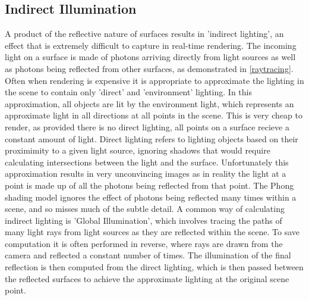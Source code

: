 \documentclass[ %
                    author={Gavin Parker},
                supervisor={Dr. Neill Campbell},
                    degree={MEng},
                     title={Deep Siamese Networks for Illumination Estimation from Stereo Images},
                  subtitle={},
                      type={research},
                      year={2018} ]{dissertation}
\begin{document}
\subsection{Indirect Illumination}
A product of the reflective nature of surfaces results in 'indirect lighting', an effect that is extremely difficult to capture in real-time rendering. The incoming light on a surface is made of photons arriving directly from light sources as well as photons being reflected from other surfaces, as demonstrated in \ref{raytracing}. Often when rendering is expensive it is appropriate to approximate the lighting in the scene to contain only 'direct' and 'environment' lighting. In this approximation, all objects are lit by the environment light, which represents an approximate light in all directions at all points in the scene. This is very cheap to render, as provided there is no direct lighting, all points on a surface recieve a constant amount of light. Direct lighting refers to lighting objects based on their proximimity to a given light source, ignoring shadows that would require calculating intersections between the light and the surface. Unfortunately this approximation results in very unconvincing images as in reality the light at a point is made up of all the photons being reflected from that point. The Phong shading model ignores the effect of photons being reflected many times within a scene, and so misses much of the subtle detail. A common way of calculating indirect lighting is 'Global Illumination', which involves tracing the paths of many light rays from light sources as they are reflected within the scene. To save computation it is often performed in reverse, where rays are drawn from the camera and reflected a constant number of times. The illumination of the final reflection is then computed from the direct lighting, which is then passed between the reflected surfaces to achieve the approximate lighting at the original scene point.
\end{document}
